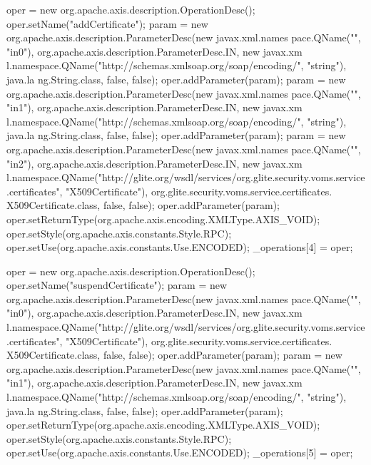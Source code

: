 \begin{DoxyCode}
{        oper = new org.apache.axis.description.OperationDesc();
        oper.setName("addCertificate");
        param = new org.apache.axis.description.ParameterDesc(new javax.xml.names
      pace.QName("", "in0"), org.apache.axis.description.ParameterDesc.IN, new javax.xm
      l.namespace.QName("http://schemas.xmlsoap.org/soap/encoding/", "string"), java.la
      ng.String.class, false, false);
        oper.addParameter(param);
        param = new org.apache.axis.description.ParameterDesc(new javax.xml.names
      pace.QName("", "in1"), org.apache.axis.description.ParameterDesc.IN, new javax.xm
      l.namespace.QName("http://schemas.xmlsoap.org/soap/encoding/", "string"), java.la
      ng.String.class, false, false);
        oper.addParameter(param);
        param = new org.apache.axis.description.ParameterDesc(new javax.xml.names
      pace.QName("", "in2"), org.apache.axis.description.ParameterDesc.IN, new javax.xm
      l.namespace.QName("http://glite.org/wsdl/services/org.glite.security.voms.service
      .certificates", "X509Certificate"), org.glite.security.voms.service.certificates.
      X509Certificate.class, false, false);
        oper.addParameter(param);
        oper.setReturnType(org.apache.axis.encoding.XMLType.AXIS_VOID);
        oper.setStyle(org.apache.axis.constants.Style.RPC);
        oper.setUse(org.apache.axis.constants.Use.ENCODED);
        _operations[4] = oper;

        oper = new org.apache.axis.description.OperationDesc();
        oper.setName("suspendCertificate");
        param = new org.apache.axis.description.ParameterDesc(new javax.xml.names
      pace.QName("", "in0"), org.apache.axis.description.ParameterDesc.IN, new javax.xm
      l.namespace.QName("http://glite.org/wsdl/services/org.glite.security.voms.service
      .certificates", "X509Certificate"), org.glite.security.voms.service.certificates.
      X509Certificate.class, false, false);
        oper.addParameter(param);
        param = new org.apache.axis.description.ParameterDesc(new javax.xml.names
      pace.QName("", "in1"), org.apache.axis.description.ParameterDesc.IN, new javax.xm
      l.namespace.QName("http://schemas.xmlsoap.org/soap/encoding/", "string"), java.la
      ng.String.class, false, false);
        oper.addParameter(param);
        oper.setReturnType(org.apache.axis.encoding.XMLType.AXIS_VOID);
        oper.setStyle(org.apache.axis.constants.Style.RPC);
        oper.setUse(org.apache.axis.constants.Use.ENCODED);
        _operations[5] = oper;

}
\end{DoxyCode}
